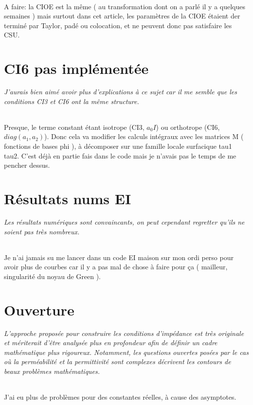 \documentclass{article}
\newenvironment{REM}{\itshape}{}
\newenvironment{REP}{~{}\\}{}
\begin{document}
\begin{REP}
    A faire: la CIOE est la même ( au transformation dont on a parlé il y a quelques semaines ) mais surtout dans cet article, les paramètres de la CIOE étaient der terminé par Taylor, padé ou colocation, et ne peuvent donc pas satisfaire les CSU.
\end{REP}

\section{CI6 pas implémentée}
\begin{REM}
    J’aurais bien aimé avoir plus d’explications à ce sujet car il me semble que les conditions CI3 et CI6 ont la même structure.
\end{REM}

\begin{REP}
    Presque, le terme constant étant isotrope (CI3, \(a_0 I\)) ou orthotrope (CI6, \(diag(a_1,a_2)\)).
    Donc cela va modifier les calculs intégraux avec les matrices M ( fonctions de bases phi ), à décomposer sur une famille locale surfacique tau1 tau2.
    C'est déjà en partie fais dans le code mais je n'avais pas le temps de me pencher dessus.
\end{REP}

\section{Résultats nums EI}
\begin{REM}
    Les résultats numériques sont convaincants, on peut cependant regretter qu’ils ne soient pas très nombreux.
\end{REM}

\begin{REP}
    Je n'ai jamais su me lancer dans un code EI maison sur mon ordi perso pour avoir plus de courbes car il y a pas mal de chose à faire pour ça ( mailleur, singularité du noyau de Green ).
\end{REP}

\section{Ouverture}
\begin{REM}
    L’approche proposée pour construire les conditions d’impédance est très originale et mériterait d’être analysée plus en profondeur afin de définir un cadre mathématique plus rigoureux.
    Notamment, les questions ouvertes posées par le cas où la perméabilité et la permittivité sont complexes décrivent les contours de beaux problèmes mathématiques.
\end{REM}

\begin{REP}
    J'ai eu plus de problèmes pour des constantes réelles, à cause des asymptotes.
\end{REP}
\end{document}
